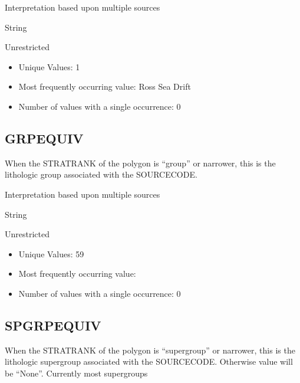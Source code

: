 \documentclass[letterpaper,10pt,english]{sphinxmanual}
\begin{document}
Interpretation based upon multiple sources

String


Unrestricted

\begin{itemize}
\item {} 
Unique Values: 1

\item {} 
Most frequently occurring value: Ross Sea Drift

\item {} 
Number of values with a single occurrence: 0

\end{itemize}


\subsection{GRPEQUIV}
\label{\detokenize{field_glossary:grpequiv}}
When the STRATRANK of the polygon is “group” or narrower, this is the lithologic group associated with the SOURCECODE.

Interpretation based upon multiple sources

String


Unrestricted

\begin{itemize}
\item {} 
Unique Values: 59

\item {} 
Most frequently occurring value:

\item {} 
Number of values with a single occurrence: 0

\end{itemize}


\subsection{SPGRPEQUIV}
\label{\detokenize{field_glossary:spgrpequiv}}
When the STRATRANK of the polygon is “supergroup” or narrower, this is the lithologic supergroup associated with the SOURCECODE. Otherwise value will be “None”. Currently most supergroups
\end{document}
